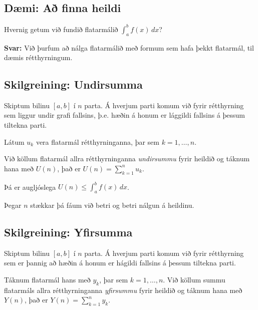 \documentclass[b5paper,11pt,icelandic]{sphinxmanual}
\begin{document}
\subsection{Dæmi: Að finna heildi}
\label{kafli06:daemi-a-finna-heildi}
Hvernig getum við fundið flatarmálið \(\int_a^b f(x)\, dx\)?

\textbf{Svar:} Við þurfum að nálga flatarmálið með formum sem hafa þekkt
flatarmál, til dæmis rétthyrningum.


\subsection{Skilgreining: Undirsumma}
\label{kafli06:skilgreining-undirsumma}\label{kafli06:index-1}
Skiptum bilinu \([a,b]\) í \(n\) parta. Á hverjum parti komum
við fyrir rétthyrning sem liggur undir grafi fallsins, þ.e. hæðin á
honum er lággildi fallsins á þessum tiltekna parti.


Látum \(u_k\) vera flatarmál rétthyrninganna, þar sem
\(k=1,\ldots,n\).

Við köllum flatarmál allra rétthyrninganna \textit{undirsummu} fyrir heildið og
táknum hana með \(U(n)\), það er \(U(n) = \sum_{k=1}^n u_k\).

Þá er augljóslega \(U(n) \leq \int_a^b f(x)\, dx\).

Þegar \(n\) stækkar þá fáum við betri og betri nálgun á heildinu.


\subsection{Skilgreining: Yfirsumma}
\label{kafli06:skilgreining-yfirsumma}\label{kafli06:index-2}
Skiptum bilinu \([a,b]\) í \(n\) parta. Á hverjum parti komum
við fyrir rétthyrning sem er þannig að hæðin á honum er hágildi fallsins
á þessum tiltekna parti.


Táknum flatarmál hans með \(y_k\), þar sem \(k=1,\ldots,n\). Við
köllum summu flatarmáls allra rétthyrninganna \textit{yfirsummu} fyrir heildið
og táknum hana með \(Y(n)\), það er \(Y(n) = \sum_{k=1}^n y_k\).
\end{document}
